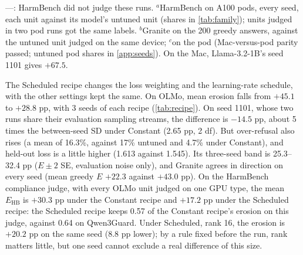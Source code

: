 \documentclass[11pt]{article}
\newcommand{\Ehb}{E_{\mathrm{HB}}}
\begin{document}
\begin{table}[t]
  \smallskip
  \parbox{\textwidth}{\footnotesize\raggedright
    ---: HarmBench did not judge these runs.
    $^{a}$HarmBench on A100 pods, every seed, each unit against its model's
    untuned unit (shares in \cref{tab:family}); units judged in two pod runs
    got the same labels.
    $^{b}$Granite on the 200 greedy answers, against the untuned unit judged on
    the same device; $^{c}$on the pod (Mac-versus-pod parity passed; untuned
    pod shares in \cref{app:seeds}). On the Mac, Llama-3.2-1B's seed 1101
    gives $+67.5$.}
\end{table}

The Scheduled recipe changes the loss weighting and the learning-rate
schedule, with the other settings kept the same. On OLMo, mean erosion falls
from $+45.1$ to $+28.8$ pp, with 3 seeds of each recipe (\cref{tab:recipe}).
On seed 1101, whose two runs share their evaluation sampling streams, the
difference is $-14.5$ pp, about 5 times the between-seed SD under Constant
(2.65 pp, 2 df). But over-refusal also rises (a mean of 16.3\%, against
17\% untuned and 4.7\% under Constant), and held-out loss is a little higher
(1.613 against 1.545).
Its three-seed band is 25.3--32.4 pp ($E \pm 2$ SE, evaluation noise only), and
Granite agrees in direction on every seed (mean greedy $E$ $+22.3$ against
$+43.0$ pp). On the HarmBench compliance judge, with every OLMo unit judged on
one GPU type, the mean $\Ehb$ is $+30.3$ pp under the Constant recipe and
$+17.2$ pp under the Scheduled recipe: the Scheduled recipe keeps 0.57 of the
Constant recipe's erosion on this judge, against 0.64 on Qwen3Guard. Under
Scheduled, rank 16, the erosion is $+20.2$ pp on the same seed (8.8 pp lower);
by a rule fixed before the run, rank matters little, but one seed cannot
exclude a real difference of this size.
\end{document}
